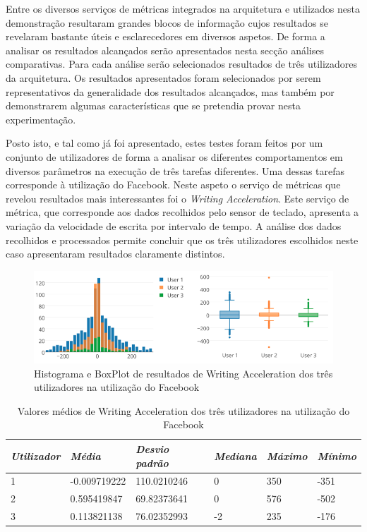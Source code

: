 Entre os diversos serviços de métricas integrados na arquitetura e utilizados nesta demonstração resultaram grandes blocos de informação cujos resultados se revelaram bastante úteis e esclarecedores em diversos aspetos. De forma a analisar os resultados alcançados serão apresentados nesta secção análises comparativas. Para cada análise serão selecionados resultados de três utilizadores da arquitetura. Os resultados apresentados foram selecionados por serem representativos da generalidade dos resultados alcançados, mas também por demonstrarem algumas características que se pretendia provar nesta experimentação.

Posto isto, e tal como já foi apresentado, estes testes foram feitos por um conjunto de utilizadores de forma a analisar os diferentes comportamentos em diversos parâmetros na execução de três tarefas diferentes. Uma dessas tarefas corresponde à utilização do Facebook. Neste aspeto o serviço de métricas que revelou resultados mais interessantes foi  o \textit{Writing Acceleration}. Este serviço de métrica, que corresponde aos dados recolhidos pelo sensor de teclado, apresenta a variação da velocidade de escrita por intervalo de tempo. A análise dos dados recolhidos e processados permite concluir que os três utilizadores escolhidos neste caso apresentaram resultados claramente distintos.

\begin{figure}[htb]
   \centering
   \includegraphics[scale=0.45]{Images/writingaccelerationfb.png}
   \caption{Histograma e BoxPlot de resultados de Writing Acceleration dos três utilizadores na utilização do Facebook}
\end{figure}

{\renewcommand{\arraystretch}{1.0}
\begin{table}[!htb]
\centering
\label{tab:a_tbk}
\vspace{2pt}
\begin{tabular}{ | l | l | l | l | l | l |  }
\hline
\textit{Utilizador}&\textit{Média}&\textit{Desvio padrão}&\textit{Mediana} & \textit{Máximo} & \textit{Mínimo}\\  
\hline
1&-0.009719222&110.0210246&0&350&-351 \\
2&0.595419847&69.82373641&0&576&-502 \\
3&0.113821138&76.02352993&-2&235&-176 \\
\hline
\end{tabular}
\caption{Valores médios de Writing Acceleration dos três utilizadores na utilização do Facebook} 
\end{table}}

